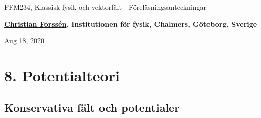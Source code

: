 \documentclass[%
oneside,                 %
final,                   %
10pt]{article}
\begin{document}

\newcommand{\exercisesection}[1]{\subsection*{#1}}







\thispagestyle{empty}

\begin{center}
{\LARGE\bf
\begin{spacing}{1.25}
FFM234, Klassisk fysik och vektorfält - Föreläsningsanteckningar
\end{spacing}
}
\end{center}


\begin{center}
{\bf \href{{http://fy.chalmers.se/subatom/tsp/}}{Christian Forssén}, Institutionen för fysik, Chalmers, Göteborg, Sverige${}^{}$} \\ [0mm]
\end{center}

\begin{center}
\end{center}
    

\begin{center}
Aug 18, 2020
\end{center}

\vspace{1cm}


\section*{8. Potentialteori}

\subsection*{Konservativa fält och potentialer}
\end{document}
